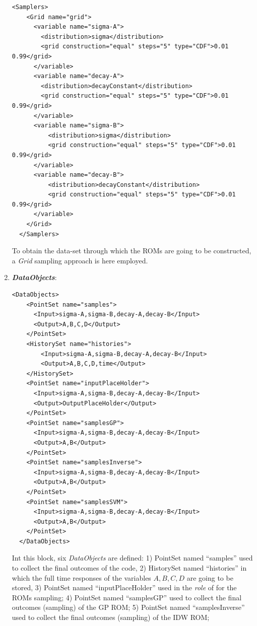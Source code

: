 \begin{enumerate}
\begin{lstlisting}[style=XML,morekeywords={arg,extension,pauseAtEnd,overwrite}]
  <Samplers>
    <Grid name="grid">
      <variable name="sigma-A">
        <distribution>sigma</distribution>
        <grid construction="equal" steps="5" type="CDF">0.01 0.99</grid>
      </variable>
      <variable name="decay-A">
        <distribution>decayConstant</distribution>
        <grid construction="equal" steps="5" type="CDF">0.01 0.99</grid>
      </variable>
      <variable name="sigma-B">
          <distribution>sigma</distribution>
          <grid construction="equal" steps="5" type="CDF">0.01 0.99</grid>
      </variable>
      <variable name="decay-B">
          <distribution>decayConstant</distribution>
          <grid construction="equal" steps="5" type="CDF">0.01 0.99</grid>
      </variable>
    </Grid>
  </Samplers>
\end{lstlisting}
  To obtain the data-set through which the ROMs are going to be
  constructed, a \textit{Grid} sampling approach is here employed.
   \item \textbf{\textit{DataObjects}}:
\begin{lstlisting}[style=XML,morekeywords={arg,extension,pauseAtEnd,overwrite}]
  <DataObjects>
    <PointSet name="samples">
      <Input>sigma-A,sigma-B,decay-A,decay-B</Input>
      <Output>A,B,C,D</Output>
    </PointSet>
    <HistorySet name="histories">
        <Input>sigma-A,sigma-B,decay-A,decay-B</Input>
        <Output>A,B,C,D,time</Output>
    </HistorySet>
    <PointSet name="inputPlaceHolder">
      <Input>sigma-A,sigma-B,decay-A,decay-B</Input>
      <Output>OutputPlaceHolder</Output>
    </PointSet>
    <PointSet name="samplesGP">
      <Input>sigma-A,sigma-B,decay-A,decay-B</Input>
      <Output>A,B</Output>
    </PointSet>
    <PointSet name="samplesInverse">
      <Input>sigma-A,sigma-B,decay-A,decay-B</Input>
      <Output>A,B</Output>
    </PointSet>
    <PointSet name="samplesSVM">
      <Input>sigma-A,sigma-B,decay-A,decay-B</Input>
      <Output>A,B</Output>
    </PointSet>
  </DataObjects>
\end{lstlisting}
  Int this block, six \textit{DataObjects} are defined: 1) PointSet
  named ``samples'' used to collect the final outcomes of the code, 2)
  HistorySet named ``histories'' in which the full time responses of the
  variables $A,B,C,D$ are going to be stored, 3) PointSet named
  ``inputPlaceHolder'' used in the \textit{role} of  for the ROMs sampling;
  4) PointSet named ``samplesGP'' used to collect the final outcomes (sampling) of the GP ROM;
  5) PointSet named ``samplesInverse'' used to collect the final outcomes (sampling) of the IDW ROM;

\end{enumerate}
